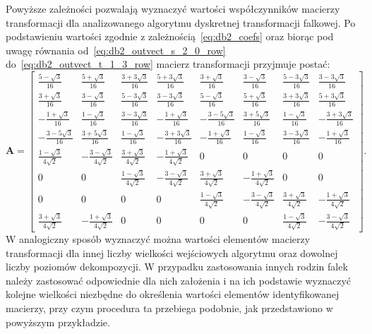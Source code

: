 Powyższe zależności pozwalają wyznaczyć wartości współczynników macierzy transformacji dla analizowanego algorytmu dyskretnej transformacji falkowej. Po podstawieniu wartości zgodnie z zależnością~\eqref{eq:db2_coefs} oraz biorąc pod uwagę równania od~\eqref{eq:db2_outvect_s_2_0_row} do~\eqref{eq:db2_outvect_t_1_3_row} macierz transformacji przyjmuje postać:
\begin{equation}
\mathbf{A} =
\begin{bmatrix}
\frac{5 - \sqrt{3}}{16} & \frac{5 + \sqrt{3}}{16} & \frac{3 + 3 \sqrt{3}}{16} & \frac{5 + 3 \sqrt{3}}{16} & \frac{3 + \sqrt{3}}{16} & \frac{3 - \sqrt{3}}{16} & \frac{5 - 3 \sqrt{3}}{16} & \frac{3 - 3 \sqrt{3}}{16} \\
\frac{3 + \sqrt{3}}{16} & \frac{3 - \sqrt{3}}{16} & \frac{5 - 3 \sqrt{3}}{16} & \frac{3 - 3 \sqrt{3}}{16} & \frac{5 - \sqrt{3}}{16} & \frac{5 + \sqrt{3}}{16} & \frac{3 + 3 \sqrt{3}}{16} & \frac{5 + 3 \sqrt{3}}{16} \\
- \frac{1 + \sqrt{3}}{16} & \frac{1 - \sqrt{3}}{16} & \frac{3 - 3 \sqrt{3}}{16} & - \frac{1 + \sqrt{3}}{16} & - \frac{3 - 5 \sqrt{3}}{16} & \frac{3 + 5 \sqrt{3}}{16} & \frac{1 - \sqrt{3}}{16} & - \frac{3 + 3 \sqrt{3}}{16} \\
- \frac{3 - 5 \sqrt{3}}{16} & \frac{3 + 5 \sqrt{3}}{16} & \frac{1 - \sqrt{3}}{16} & - \frac{3 + 3 \sqrt{3}}{16} & - \frac{1 + \sqrt{3}}{16} & \frac{1 - \sqrt{3}}{16} & \frac{3 - 3 \sqrt{3}}{16} & - \frac{1 + \sqrt{3}}{16} \\
\frac{1 - \sqrt{3}}{4 \sqrt{2}} & - \frac{3 - \sqrt{3}}{4 \sqrt{2}} & \frac{3 + \sqrt{3}}{4 \sqrt{2}} & - \frac{1 + \sqrt{3}}{4 \sqrt{2}} & 0 & 0 & 0 & 0 \\
0 & 0 & \frac{1 - \sqrt{3}}{4 \sqrt{2}} & - \frac{3 - \sqrt{3}}{4 \sqrt{2}} & \frac{3 + \sqrt{3}}{4 \sqrt{2}} & - \frac{1 + \sqrt{3}}{4 \sqrt{2}} & 0 & 0 \\
0 & 0 & 0 & 0 & \frac{1 - \sqrt{3}}{4 \sqrt{2}} & - \frac{3 - \sqrt{3}}{4 \sqrt{2}} & \frac{3 + \sqrt{3}}{4 \sqrt{2}} & - \frac{1 + \sqrt{3}}{4 \sqrt{2}} \\
\frac{3 + \sqrt{3}}{4 \sqrt{2}} & - \frac{1 + \sqrt{3}}{4 \sqrt{2}} & 0 & 0 & 0 & 0 & \frac{1 - \sqrt{3}}{4 \sqrt{2}} & - \frac{3 - \sqrt{3}}{4 \sqrt{2}}
\end{bmatrix}
\label{eq:db2_2_8_matrix}.
\end{equation}
W analogiczny sposób wyznaczyć można wartości elementów macierzy transformacji dla innej liczby wielkości wejściowych algorytmu oraz dowolnej liczby poziomów dekompozycji. W przypadku zastosowania innych rodzin falek należy zastosować odpowiednie dla nich założenia i na ich podstawie wyznaczyć kolejne wielkości niezbędne do określenia wartości elementów identyfikowanej macierzy, przy czym procedura ta przebiega podobnie, jak przedstawiono w powyższym przykładzie.

